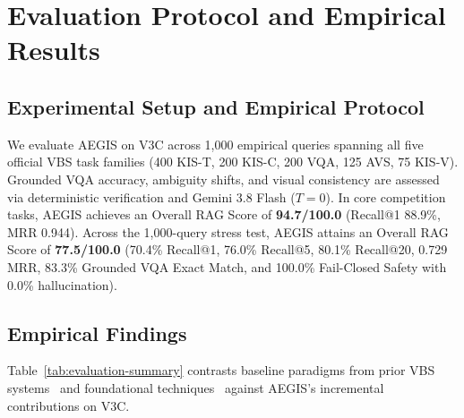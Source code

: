 \documentclass[runningheads,a4paper]{llncs}
\begin{document}
\section{Evaluation Protocol and Empirical Results}
\label{sec:evaluation}

\subsection{Experimental Setup and Empirical Protocol}
We evaluate AEGIS on V3C across 1,000 empirical queries spanning all five official VBS task families (400 KIS-T, 200 KIS-C, 200 VQA, 125 AVS, 75 KIS-V). Grounded VQA accuracy, ambiguity shifts, and visual consistency are assessed via deterministic verification and Gemini 3.8 Flash ($T=0$). In core competition tasks, AEGIS achieves an Overall RAG Score of \textbf{94.7/100.0} (Recall@1 88.9\%, MRR 0.944). Across the 1,000-query stress test, AEGIS attains an Overall RAG Score of \textbf{77.5/100.0} (70.4\% Recall@1, 76.0\% Recall@5, 80.1\% Recall@20, 0.729 MRR, 83.3\% Grounded VQA Exact Match, and 100.0\% Fail-Closed Safety with 0.0\% hallucination).

\subsection{Empirical Findings}
Table~\ref{tab:evaluation-summary} contrasts baseline paradigms from prior VBS systems~\cite{jackl2026prak,rossetto2021vitrivr,tran2026niiuit,khan2026exquisitor,le2025fustar} and foundational techniques~\cite{zhai2023sigmoid,cormack2009reciprocal,sekulic2021evaluating,wemm2025} against AEGIS's incremental contributions on V3C.
\end{document}
